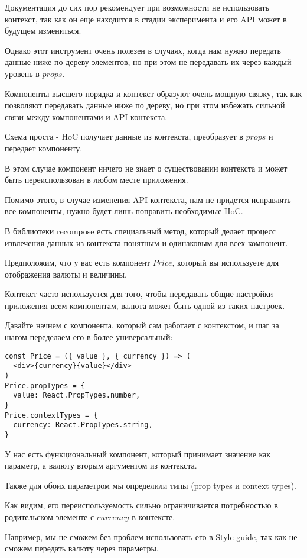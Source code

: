 Документация до сих пор рекомендует при возможности не использовать контекст, так как он еще находится в стадии эксперимента и его API может в будущем измениться.

Однако этот инструмент очень полезен в случаях, когда нам нужно передать данные ниже по дереву элементов, но при этом не передавать их через каждый уровень в $props$.

Компоненты высшего порядка и контекст образуют очень мощную связку, так как позволяют передавать данные ниже по дереву, но при этом избежать сильной связи между компонентами и API контекста.

Схема проста - HoC получает данные из контекста, преобразует в $props$ и передает компоненту.

В этом случае компонент ничего не знает о существовании контекста и может быть переиспользован в любом месте приложения.

Помимо этого, в случае изменения API контекста, нам не придется исправлять все компоненты, нужно будет лишь поправить необходимые HoC.

В библиотеки recompose есть специальный метод, который делает процесс извлечения данных из контекста понятным и одинаковым для всех компонент.

Предположим, что у вас есть компонент $Price$, который вы используете для отображения валюты и величины. 
 
 Контекст часто используется для того, чтобы передавать общие настройки приложения всем компонентам, валюта может быть одной из таких настроек.
 
 Давайте начнем с компонента, который сам работает с контекстом, и шаг за шагом переделаем его в более универсальный:
 
\begin{lstlisting}
const Price = ({ value }, { currency }) => (
  <div>{currency}{value}</div>
)
Price.propTypes = {
  value: React.PropTypes.number,
}
Price.contextTypes = {
  currency: React.PropTypes.string,
}
\end{lstlisting}

У нас есть функциональный компонент, который принимает значение как параметр, а валюту вторым аргументом из контекста.

Также для обоих параметром мы определили типы (prop types и context types).

Как видим, его переиспользуемость сильно ограничивается потребностью в родительском элементе с $currency$ в контексте.

Например, мы не сможем без проблем использовать его в Style guide, так как не сможем передать валюту через параметры.


